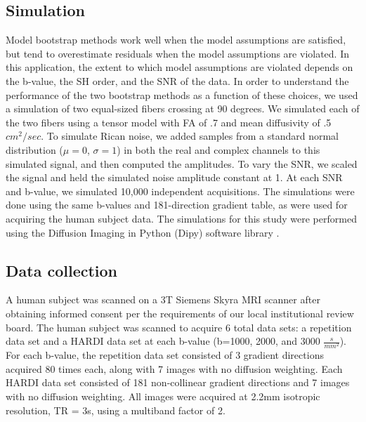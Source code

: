 \subsection{Simulation}

Model bootstrap methods work well when the model assumptions are
satisfied, but tend to overestimate residuals when the model assumptions
are violated. In this application, the extent to which model assumptions
are violated depends on the b-value, the SH order, and the SNR of the
data. In order to understand the performance of the two bootstrap
methods as a function of these choices, we used a simulation of two
equal-sized fibers crossing at 90 degrees. We simulated each of the two
fibers using a tensor model with FA of .7 and mean diffusivity of .5 $cm^2/sec$. To simulate Rican noise, we added samples from a
standard normal distribution (\(\mu = 0\), \(\sigma = 1\)) in both the
real and complex channels to this simulated signal, and then computed
the amplitudes. To vary the SNR, we scaled the signal and held the
simulated noise amplitude constant at 1. At each SNR and b-value, we
simulated 10,000 independent acquisitions. The simulations were done
using the same b-values and 181-direction gradient table, as were used
for acquiring the human subject data. The simulations for this study
were performed using the Diffusion Imaging in Python (Dipy) software
library \cite{Garyfallidis_2014}.

\subsection{Data collection}

A human subject was scanned on a 3T Siemens Skyra MRI scanner after
obtaining informed consent per the requirements of our local
institutional review board. The human subject was scanned to acquire 6
total data sets: a repetition data set and a HARDI data set at each
b-value (b=1000, 2000, and 3000 \(\frac{s}{mm^{2}}\)). For each b-value,
the repetition data set consisted of 3 gradient directions acquired 80
times each, along with 7 images with no diffusion weighting. Each HARDI
data set consisted of 181 non-collinear gradient directions and 7 images
with no diffusion weighting. All images were acquired at 2.2mm isotropic
resolution, TR = 3s, using a multiband factor of 2.

